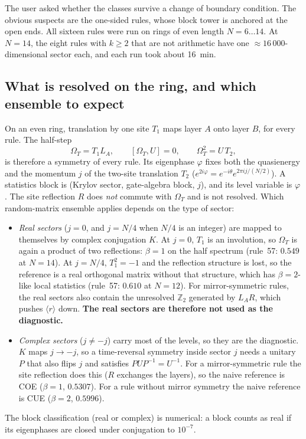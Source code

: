 The user asked whether the classes survive a change of boundary condition. The obvious suspects are the one-sided
rules, whose block tower is anchored at the open ends. All sixteen rules were run on rings of even length $N=6\ldots14$. At $N=14$, the eight rules with $k\ge2$ that are not
arithmetic have one $\approx16\,000$-dimensional sector each, and each run took about 16~min.

\subsection{What is resolved on the ring, and which ensemble to expect}
On an even ring, translation by one site $T_1$ maps layer $A$ onto layer $B$, for every rule. The half-step
\begin{equation}
  \Omega_T = T_1 L_A,\qquad [\Omega_T,U]=0,\qquad \Omega_T^2 = U\,T_2,
\end{equation}
is therefore a symmetry of every rule. Its eigenphase $\varphi$ fixes both the quasienergy and the momentum $j$ of the
two-site translation $T_2$ ($e^{2i\varphi}=e^{-i\theta}e^{2\pi i j/(N/2)}$). A statistics block is
(Krylov sector, gate-algebra block, $j$), and its level variable is $\varphi$. The site reflection $R$ does \emph{not}
commute with $\Omega_T$ and is not resolved. Which random-matrix ensemble applies depends on the type of sector:
\begin{itemize}
\item \emph{Real sectors} ($j=0$, and $j=N/4$ when $N/4$ is an integer) are mapped to themselves by complex conjugation
  $K$. At $j=0$, $T_1$ is an involution, so $\Omega_T$ is again a product of two reflections: $\beta=1$ on the half
  spectrum (rule~57: $0.549$ at $N=14$). At $j=N/4$, $T_1^2=-1$ and the reflection structure is lost, so the reference is
  a real orthogonal matrix without that structure, which has $\beta=2$-like local statistics (rule~57: $0.610$ at
  $N=12$). For mirror-symmetric rules, the real sectors also contain the unresolved $\mathbb Z_2$ generated by $L_AR$,
  which pushes $\langle r\rangle$ down. \textbf{The real sectors are therefore not used as the diagnostic.}
\item \emph{Complex sectors} ($j\ne -j$) carry most of the levels, so they are the diagnostic. $K$ maps $j\to-j$, so a
  time-reversal symmetry inside sector $j$ needs a unitary $P$ that also flips $j$ and satisfies $PUP^{-1}=U^{-1}$. For a
  mirror-symmetric rule the site reflection does this ($R$ exchanges the layers), so the naive reference is COE ($\beta=1$,
  $0.5307$). For a rule without mirror symmetry the naive reference is CUE ($\beta=2$, $0.5996$).
\end{itemize}
The block classification (real or complex) is numerical: a block counts as real if its eigenphases are closed under
conjugation to $10^{-7}$.

